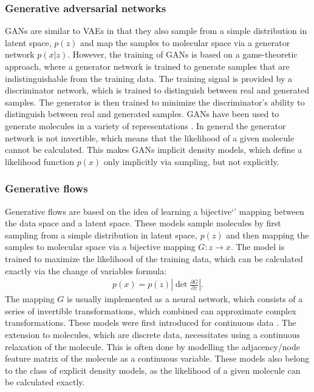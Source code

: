 \subsubsection{Generative adversarial networks}
\Acp{GAN} are similar to VAEs in that
they also sample from a simple distribution in latent space, $p(z)$ and map the samples to 
molecular space via a generator network $p(x|z)$.
However, the training of GANs is based on a game-theoretic approach, where a
generator network is trained to generate samples that are indistinguishable from
the training data. The training signal is provided by a discriminator network,
which is trained to distinguish between real and generated samples. The generator
is then trained to minimize the discriminator's ability to distinguish between
real and generated samples. GANs have been used to generate molecules 
in a variety of representations \citep{todo}. In general the generator network
is not invertible, which means that the likelihood of a given molecule cannot
be calculated. This makes GANs implicit density models, which define a 
likelihood function $p(x)$ only implicitly via sampling, but not explicitly.

\subsubsection{Generative flows}
Generative flows are based on the idea of learning a bijective`'
mapping between the data space and a latent space. These 
models sample molecules by first sampling from a simple distribution in latent
space, $p(z)$ and then mapping the samples to molecular space via a
bijective mapping $G: z \rightarrow x$. The model is trained to maximize the
likelihood of the training data, which can be calculated exactly via 
the change of variables formula:
\begin{align}
    p(x) = p(z) \left| \det \frac{\partial G}{\partial z} \right|.
\end{align}
The mapping $G$ is usually implemented as a neural network, which consists
of a series of invertible transformations, which combined can approximate 
complex transformations. These models were first introduced for continuous data
\citet{rezendeVariationalInferenceNormalizing2016}. The extension to molecules,
which are discrete data, necessitates using a continuous relaxation of the
molecule. This is often done by modelling the adjacency/node feature matrix of
the molecule as a continuous variable. These models also belong to the class of
explicit density models, as the likelihood of a given molecule can be calculated
exactly.

